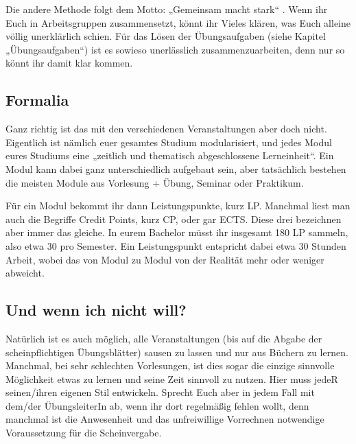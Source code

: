 Die andere Methode folgt dem Motto: „Gemeinsam macht stark“ . Wenn ihr Euch in Arbeitsgruppen zusammensetzt, könnt ihr Vieles klären, was Euch alleine völlig unerklärlich schien. Für das Lösen der Übungsaufgaben (siehe Kapitel „Übungsaufgaben“) ist es sowieso unerlässlich zusammenzuarbeiten, denn nur so könnt ihr damit klar kommen.

\subsection{Formalia}
Ganz richtig ist das mit den verschiedenen Veranstaltungen aber doch nicht. Eigentlich ist nämlich euer gesamtes Studium modularisiert, und jedes Modul eures Studiums eine „zeitlich und thematisch abgeschlossene Lerneinheit“. Ein Modul kann dabei ganz unterschiedlich aufgebaut sein, aber tatsächlich bestehen die meisten Module aus Vorlesung + Übung, Seminar oder Praktikum.

Für ein Modul bekommt ihr dann Leistungspunkte, kurz \gls{LP}. Manchmal liest man auch die Begriffe Credit Points, kurz \gls{CP}, oder gar \gls{ECTS}. Diese drei bezeichnen aber immer das gleiche. In eurem Bachelor müsst ihr insgesamt 180 \gls{LP} sammeln, also etwa 30 pro Semester. Ein Leistungspunkt entspricht dabei etwa 30 Stunden Arbeit, wobei das von Modul zu Modul von der Realität mehr oder weniger abweicht.

\subsection{Und wenn ich nicht will?}
Natürlich ist es auch möglich, alle Veranstaltungen (bis auf die Abgabe der scheinpflichtigen Übungsblätter) sausen zu lassen und nur aus Büchern zu lernen. Manchmal, bei sehr schlechten Vorlesungen, ist dies sogar die einzige sinnvolle Möglichkeit etwas zu lernen und seine Zeit sinnvoll zu nutzen. Hier muss jedeR seinen/ihren eigenen Stil entwickeln. Sprecht Euch aber in jedem Fall mit dem/der ÜbungsleiterIn ab, wenn ihr dort regelmäßig fehlen wollt, denn manchmal ist die Anwesenheit und das unfreiwillige Vorrechnen notwendige Voraussetzung für die Scheinvergabe.
